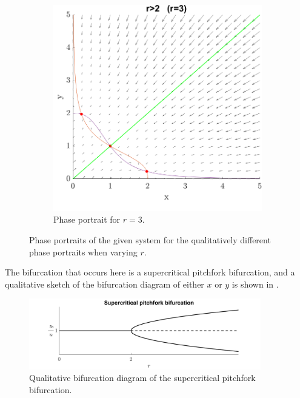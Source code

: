 \documentclass[a4paper,11pt]{article}
\begin{document}
\begin{figure}[H]
{		\begin{subfigure}[b]{0.5\textwidth}
		\includegraphics[width=\textwidth]{rgt2.png}
		\caption{Phase portrait for $r=3$.}
		\label{fig:rgt2}
		\end{subfigure}
	}
	\label{fig:pp1}
	\caption{Phase portraits of the given system for the qualitatively different phase portraits when varying $r$.}
\end{figure}
The bifurcation that occurs here is a supercritical pitchfork bifurcation, and a qualitative sketch of the bifurcation diagram of
either $x$ or $y$ is shown in .
\begin{figure}
	\centering
	\includegraphics[width=0.9\textwidth]{suppit.png}
	\caption{Qualitative bifurcation diagram of the supercritical pitchfork bifurcation.}
	\label{fig:bif} 
\end{figure}
\end{document}
